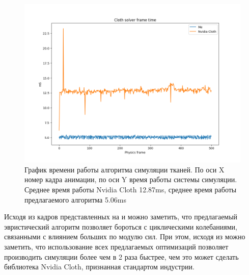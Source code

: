 	\begin{figure}[ht!] 
		\center
		\includegraphics [scale=0.7] {my_folder/images//frameTimePlot}	
		\caption{График времени работы алгоритма симуляции тканей. По оси X номер кадра анимации, по оси Y время работы системы симуляции. Среднее время работы Nvidia Cloth 12.87ms, среднее время работы предлагаемого алгоритма 5.06ms } 
		\label{fig:solversPlot}
	\end{figure}
	\FloatBarrier
	
	Исходя из кадров представленных на  и  можно заметить, что предлагаемый эвристический алгоритм позволяет бороться с циклическими колебаниями, связанными с влиянием больших по модулю сил. При этом, исходя из  можно заметить, что использование всех предлагаемых оптимизаций позволяет производить симуляции более чем в 2 раза быстрее, чем это может сделать библиотека Nvidia Cloth, признанная стандартом индустрии.
	
	


